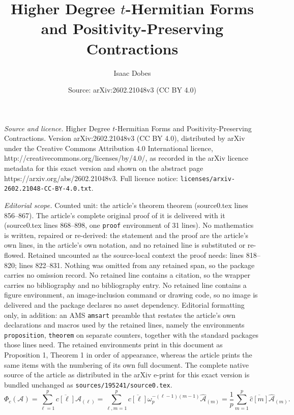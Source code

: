 \documentclass[10pt,a4paper]{amsart}
\title{Higher Degree $t$-Hermitian Forms and Positivity-Preserving Contractions}
\author{Isaac Dobes}
\date{Source: arXiv:2602.21048v3 (CC BY 4.0)}
\begin{document}
\maketitle

\noindent\emph{Source and licence.} Higher Degree $t$-Hermitian Forms and Positivity-Preserving Contractions. Version arXiv:2602.21048v3 (CC BY 4.0), distributed by arXiv under the Creative Commons Attribution 4.0 International licence, http://creativecommons.org/licenses/by/4.0/, as recorded in the arXiv licence metadata for this exact version and shown on the abstract page https://arxiv.org/abs/2602.21048v3. Full licence notice: \texttt{licenses/arxiv-2602.21048-CC-BY-4.0.txt}.\par\smallskip

\noindent\textit{Editorial scope.} Counted unit: the article's theorem theorem (source0.tex lines 856--867). The article's complete original proof of it is delivered with it (source0.tex lines 868--898, one \texttt{proof} environment of 31 lines). No mathematics is written, repaired or re-derived: the statement and the proof are the article's own lines, in the article's own notation, and no retained line is substituted or re-flowed.  Retained uncounted as the source-local context the proof needs: lines 818--820; lines 822--831.  Nothing was omitted from any retained span, so the package carries no omission record.  No retained line contains a citation, so the wrapper carries no bibliography and no bibliography entry.  No retained line contains a figure environment, an image-inclusion command or drawing code, so no image is delivered and the package declares no asset dependency.  Editorial formatting only, in addition: an AMS \texttt{amsart} preamble that restates the article's own declarations and macros used by the retained lines, namely the environments \texttt{proposition}, \texttt{theorem} on separate counters, together with the standard packages those lines need.  The retained environments print in this document as Proposition 1, Theorem 1 in order of appearance, whereas the article prints the same items with the numbering of its own full document.  The complete native source of the article as distributed in the arXiv e-print for this exact version is bundled unchanged as \texttt{sources/195241/source0.tex}.
    \begin{equation}\label{contraction hypermatrix in frequency domain}
        \Phi_c(\mathcal{A}) = \sum\limits_{\ell=1}^p\overline{c[\ell]}\mathcal{A}_{(\ell)} = \sum\limits_{\ell,m=1}^p\overline{c[\ell]}\omega_p^{-(\ell-1)(m-1)}\widehat{\mathcal{A}}_{(m)} = \frac{1}{p}\sum\limits_{m=1}^p\overline{\widehat{c}[m]}\widehat{\mathcal{A}}_{(m)}.
    \end{equation}
\end{document}
